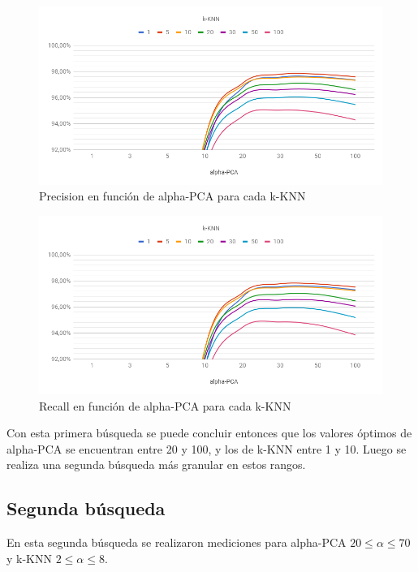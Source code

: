 \begin{figure}[H]
    \centering
    \includegraphics[width=\textwidth]{graficos/cv1_precision_zoom.png}
    \caption{Precision en función de alpha-PCA para cada k-KNN}
    \label{fig:cv1_precision_zoom}
\end{figure}

\begin{figure}[H]
    \centering
    \includegraphics[width=\textwidth]{graficos/cv1_recall_zoom.png}
    \caption{Recall en función de alpha-PCA para cada k-KNN}
    \label{fig:cv1_recall_zoom}
\end{figure}

Con esta primera búsqueda se puede concluir entonces que los valores óptimos de alpha-PCA se encuentran entre 20 y 100, y los de k-KNN entre 1 y 10. Luego se realiza una segunda búsqueda más granular en estos rangos.

\subsection{Segunda búsqueda}

En esta segunda búsqueda se realizaron mediciones para alpha-PCA $20 \leq \alpha \leq 70$ y k-KNN $2 \leq \alpha \leq 8$.

